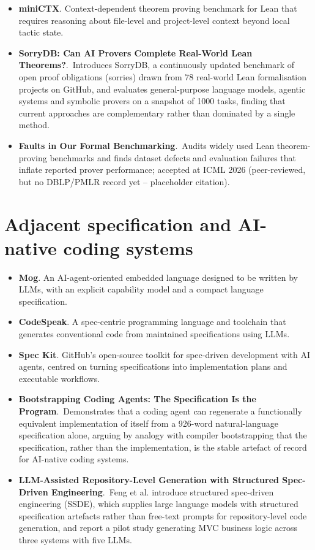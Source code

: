 \documentclass[natbib=false,acmsmall,nonacm,11pt]{acmart}
\begin{document}
\begin{itemize}
\item \textbf{miniCTX}. Context-dependent theorem proving benchmark for Lean that requires reasoning about file-level and project-level context beyond local tactic state.~\cite{DBLP:journals/corr/abs-2408-03350}
\item \textbf{SorryDB: Can AI Provers Complete Real-World Lean Theorems?}.~Introduces SorryDB, a continuously updated benchmark of open proof obligations (sorries) drawn from 78 real-world Lean formalisation projects on GitHub, and evaluates general-purpose language models, agentic systems and symbolic provers on a snapshot of 1000 tasks, finding that current approaches are complementary rather than dominated by a single method.~\cite{letson2026sorrydb}
\item \textbf{Faults in Our Formal Benchmarking}.~Audits widely used Lean theorem-proving benchmarks and finds dataset defects and evaluation failures that inflate reported prover performance; accepted at ICML 2026 (peer-reviewed, but no DBLP/PMLR record yet -- placeholder citation).~\cite{placeholder_ammanamanchi2026_icml}
\end{itemize}

\section{Adjacent specification and AI-native coding systems}\label{sec:adjacent-systems}
\begin{itemize}
\item \textbf{Mog}. An AI-agent-oriented embedded language designed to be written by LLMs, with an explicit capability model and a compact language specification.~\cite{mog_language_project}
\item \textbf{CodeSpeak}. A spec-centric programming language and toolchain that generates conventional code from maintained specifications using LLMs.~\cite{codespeak_project}
\item \textbf{Spec Kit}. GitHub's open-source toolkit for spec-driven development with AI agents, centred on turning specifications into implementation plans and executable workflows.~\cite{github_spec_kit}
\item \textbf{Bootstrapping Coding Agents: The Specification Is the Program}.~Demonstrates that a coding agent can regenerate a functionally equivalent implementation of itself from a 926-word natural-language specification alone, arguing by analogy with compiler bootstrapping that the specification, rather than the implementation, is the stable artefact of record for AI-native coding systems.~\cite{DBLP:journals/software/Monperrus26}
\item \textbf{LLM-Assisted Repository-Level Generation with Structured Spec-Driven Engineering}.~Feng et al. introduce structured spec-driven engineering (SSDE), which supplies large language models with structured specification artefacts rather than free-text prompts for repository-level code generation, and report a pilot study generating MVC business logic across three systems with five LLMs.~\cite{DBLP:conf/sigsoft/FengCMM26}
\end{itemize}

\printbibliography[heading=bibintoc,title={References}]
\end{document}
